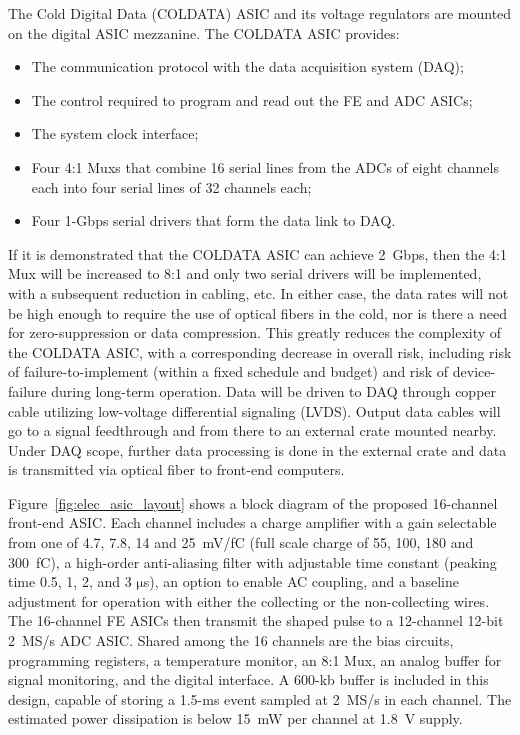 The Cold Digital Data (COLDATA) ASIC and its voltage regulators are mounted on the digital ASIC mezzanine.
The COLDATA ASIC provides:
\begin{itemize}
\item The communication protocol with the data acquisition system (DAQ);
\item The control required to program and read out the FE and ADC ASICs;
\item The system clock interface;
\item Four 4:1 Muxs that combine 16 serial lines from the ADCs of eight channels each
into four serial lines of 32 channels each;
\item Four 1-Gbps serial drivers that form the data link to DAQ.
\end{itemize}
If it is demonstrated that the COLDATA ASIC can achieve 2~Gbps,
then the 4:1 Mux will be increased to 8:1 and only two serial drivers will be implemented,
with a subsequent reduction in cabling, etc.
In either case, the data rates will not be high enough to require the use of optical fibers in the cold,
nor is there a need for zero-suppression or data compression.
This greatly reduces the complexity of the COLDATA ASIC, with a corresponding decrease in overall risk,
including risk of failure-to-implement (within a fixed schedule and budget)
and risk of device-failure during long-term operation.
Data will be driven to DAQ through copper cable utilizing low-voltage differential signaling (LVDS).
Output data cables will go to a signal feedthrough and from there to an external crate mounted nearby.
Under DAQ scope, further data processing is done in the external crate
and data is transmitted via optical fiber to front-end computers.

Figure~\ref{fig:elec_asic_layout} shows a block diagram of the proposed 16-channel front-end ASIC.
Each channel includes a charge amplifier with a gain selectable from one of 4.7, 7.8, 14 and 25~mV/fC
(full scale charge of 55, 100, 180 and 300~fC),
a high-order anti-aliasing filter with adjustable time
constant (peaking time 0.5, 1, 2, and 3 $\mathrm{\mu}$s),
an option to enable AC coupling,
and a baseline adjustment for operation with either the collecting or the non-collecting wires.
The 16-channel FE ASICs then transmit the shaped pulse to a 12-channel 12-bit 2~MS/s ADC ASIC.
Shared among the 16 channels are the bias circuits, programming registers,
a temperature monitor, an 8:1 Mux,
an analog buffer for signal monitoring, and the digital interface.
A 600-kb buffer is included in this design, capable of storing a 1.5-ms 
event sampled at 2~MS/s in each channel.
The estimated power dissipation is below 15~mW per channel at 1.8~V supply.


